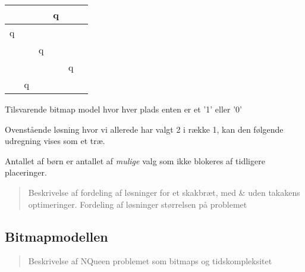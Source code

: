 \documentclass[draft,a4paper,10pt]{article}
\def\chs#1{{\chessfont#1}}
\begin{document}
\begin{tabular}{|c|c|c|c|c|c}
\hline	 &  & &   \chs{q} & \\
\hline	\chs{q} & &  &  & \\
\hline	 & & \chs{q} &  &  \\
\hline	 &  &  & & \chs{q} \\
\hline	 & \chs{q} & &  &  \\
\hline
\end{tabular}


Tilsvarende bitmap model hvor hver plads enten er et '1' eller '0'





Ovenstående løsning hvor vi allerede har valgt 2 i række 1, kan den følgende udregning vises som et træ.

Antallet af børn er antallet af \textit{mulige} valg som ikke blokeres af tidligere placeringer.

\begin{verse}
	Beskrivelse af fordeling af løsninger for et skakbræt, med & uden takakens optimeringer. Fordeling af løsninger størrelsen på problemet
\end{verse}




\subsection{Bitmapmodellen}\label{bitmapmodellen}
\begin{verse}
	Beskrivelse af NQueen problemet som bitmaps og tidskompleksitet
\end{verse}
\end{document}
